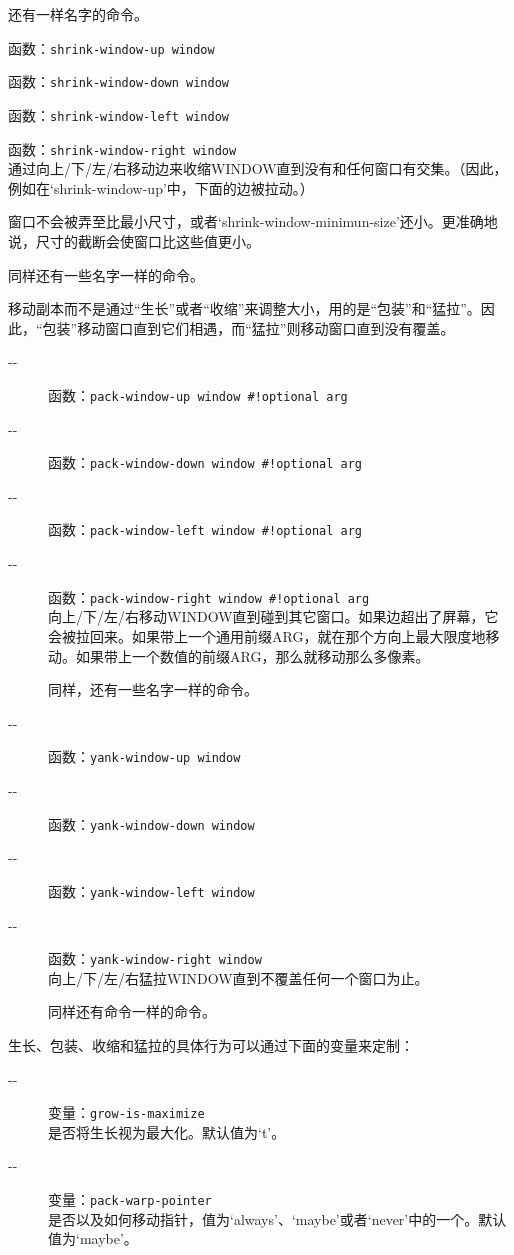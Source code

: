 \documentclass{book}
\begin{document}
\begin{CJK*}{UTF8}{gbsn}
\begin{description}
还有一样名字的命令。
\item[-{}-] 函数：\verb|shrink-window-up window|
\item[-{}-] 函数：\verb|shrink-window-down window|
\item[-{}-] 函数：\verb|shrink-window-left window|
\item[-{}-] 函数：\verb|shrink-window-right window|\\
通过向上/下/左/右移动边来收缩WINDOW直到没有和任何窗口有交集。（因此，例如在`shrink-window-up'中，下面的边被拉动。）

窗口不会被弄至比最小尺寸，或者`shrink-window-minimun-size'还小。更准确地说，尺寸的截断会使窗口比这些值更小。

同样还有一些名字一样的命令。
\end{description}

移动副本而不是通过``生长''或者``收缩''来调整大小，用的是``包装''和``猛拉''。因此，``包装''移动窗口直到它们相遇，而``猛拉''则移动窗口直到没有覆盖。
\begin{description}
\item[-{}-] 函数：\verb|pack-window-up window #!optional arg|
\item[-{}-] 函数：\verb|pack-window-down window #!optional arg|
\item[-{}-] 函数：\verb|pack-window-left window #!optional arg|
\item[-{}-] 函数：\verb|pack-window-right window #!optional arg|\\
向上/下/左/右移动WINDOW直到碰到其它窗口。如果边超出了屏幕，它会被拉回来。如果带上一个通用前缀ARG，就在那个方向上最大限度地移动。如果带上一个数值的前缀ARG，那么就移动那么多像素。

同样，还有一些名字一样的命令。
\item[-{}-] 函数：\verb|yank-window-up window|
\item[-{}-] 函数：\verb|yank-window-down window|
\item[-{}-] 函数：\verb|yank-window-left window|
\item[-{}-] 函数：\verb|yank-window-right window|\\
向上/下/左/右猛拉WINDOW直到不覆盖任何一个窗口为止。

同样还有命令一样的命令。
\end{description}

生长、包装、收缩和猛拉的具体行为可以通过下面的变量来定制：
\begin{description}
\item[-{}-] 变量：\verb|grow-is-maximize|\\
是否将生长视为最大化。默认值为`t'。
\item[-{}-] 变量：\verb|pack-warp-pointer|\\
是否以及如何移动指针，值为`always'、`maybe'或者`never'中的一个。默认值为`maybe'。


\end{description}
\end{CJK*}
\end{document}
